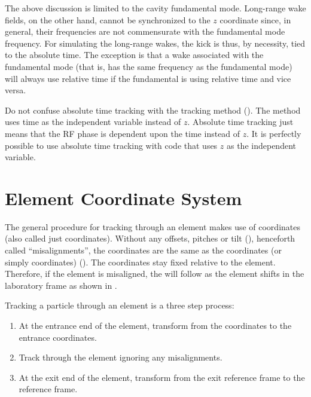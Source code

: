 The above discussion is limited to the cavity fundamental mode.
Long-range wake fields, on the other hand, cannot be synchronized to
the $z$ coordinate since, in general, their frequencies are not
commensurate with the fundamental mode frequency. For simulating the
long-range wakes, the kick is thus, by necessity, tied to the absolute
time. The exception is that a wake associated with the fundamental
mode (that is, has the same frequency as the fundamental mode) will
always use relative time if the fundamental is using relative time and
vice versa.

Do not confuse absolute time tracking with the 
tracking method (). The  method uses
time as the independent variable instead of $z$. Absolute time
tracking just means that the RF phase is dependent upon the time
instead of $z$. It is perfectly possible to use absolute time
tracking with code that uses $z$ as the independent variable.

\section{Element Coordinate System}
\label{s:ele.coords}

The general procedure for tracking through an element makes use of
 coordinates (also called just 
coordinates). Without any offsets, pitches or tilt (), henceforth
called ``misalignments'', the  coordinates are the same
as the  coordinates (or simply 
coordinates) (). The  coordinates stay fixed
relative to the element. Therefore, if the element is misaligned, the
 will follow as the element shifts in the
laboratory frame as shown in .

Tracking a particle through an element is a three step process:
\begin{enumerate}
\item
At the entrance end of the element, transform from the 
coordinates to the entrance  coordinates.
\item
Track through the element ignoring any misalignments. 
\item
At the exit end of the element, transform from the exit 
reference frame to the  reference frame.
\end{enumerate}

